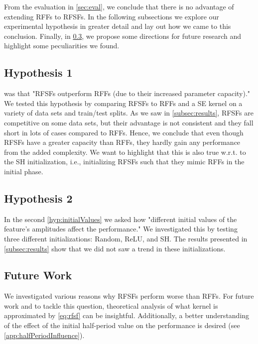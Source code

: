 From the evaluation in \cref{sec:eval}, we conclude that there is no advantage of extending \acp{RFF} to \acp{RFSF}.
In the following subsections we explore our experimental hypothesis in greater detail and lay out how we came to this conclusion.
Finally, in \cref{subsec:future}, we propose some directions for future research and highlight some peculiarities we found.

\subsection{Hypothesis 1}
	 was that "\acp{RFSF} outperform \acp{RFF} (due to their increased parameter capacity)."
	We tested this hypothesis by comparing \acp{RFSF} to \acp{RFF} and a \ac{SE} kernel on a variety of data sets and train/test splits.
	As we saw in \cref{subsec:results}, \acp{RFSF} are competitive on some data sets, but their advantage is not consistent and they fall short in lots of cases compared to \acp{RFF}.
	Hence, we conclude that even though \acp{RFSF} have a greater capacity than \acp{RFF}, they hardly gain any performance from the added complexity.
	We want to highlight that this is also true w.r.t. to the \ac{SH} initialization, i.e., initializing \acp{RFSF} such that they mimic \acp{RFF} in the initial phase.

\subsection{Hypothesis 2}
	In the second \cref{hyp:initialValues} we asked how "different initial values of the feature's amplitudes affect the performance."
	We investigated this by testing three different initializations: Random, \ac{ReLU}, and \ac{SH}.
	The results presented in \cref{subsec:results} show that we did not saw a trend in these initializations.

\subsection{Future Work}  \label{subsec:future}
	We investigated various reasons why \acp{RFSF} perform worse than \acp{RFF}.
	For future work and to tackle this question, theoretical analysis of what kernel is approximated by \cref{eq:rfsf} can be insightful.
	Additionally, a better understanding of the effect of the initial half-period value on the performance is desired (see \cref{app:halfPeriodInfluence}).
